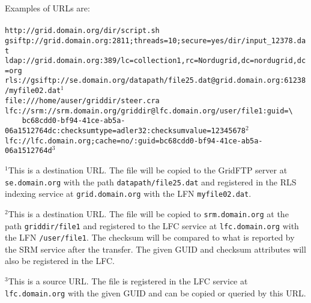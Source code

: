 \begin{framed}
   Examples of URLs are:\\
   \\
   \verb#http://grid.domain.org/dir/script.sh#\\
   \verb#gsiftp://grid.domain.org:2811;threads=10;secure=yes/dir/input_12378.dat#\\
   \verb#ldap://grid.domain.org:389/lc=collection1,rc=Nordugrid,dc=nordugrid,dc=org#\\
   \verb#rls://gsiftp://se.domain.org/datapath/file25.dat@grid.domain.org:61238/myfile02.dat#$^1$\\
   \verb#file:///home/auser/griddir/steer.cra#\\
   \verb#lfc://srm://srm.domain.org/griddir@lfc.domain.org/user/file1:guid=\# \\
   \verb#    bc68cdd0-bf94-41ce-ab5a-06a1512764dc:checksumtype=adler32:checksumvalue=12345678#$^2$\\
   \verb#lfc://lfc.domain.org;cache=no/:guid=bc68cdd0-bf94-41ce-ab5a-06a1512764d#$^3$\\
\end{framed}

$^1$This is a destination URL. The file will be copied to the GridFTP
server at \texttt{se.domain.org} with the path \texttt{datapath/file25.dat} and
registered in the RLS indexing service at \texttt{grid.domain.org} with the LFN
\texttt{myfile02.dat}.

$^2$This is a destination URL. The file will be copied to
\texttt{srm.domain.org} at the path \texttt{griddir/file1} and registered to the LFC
service at \texttt{lfc.domain.org} with the
LFN \texttt{/user/file1}. The checksum will be compared to what is
reported by the SRM service after the transfer. The given GUID and
checksum attributes will also be registered in the LFC.

$^3$This is a source URL. The file is registered in the LFC service at
\texttt{lfc.domain.org} with the given GUID and can be copied or queried by
this URL.
